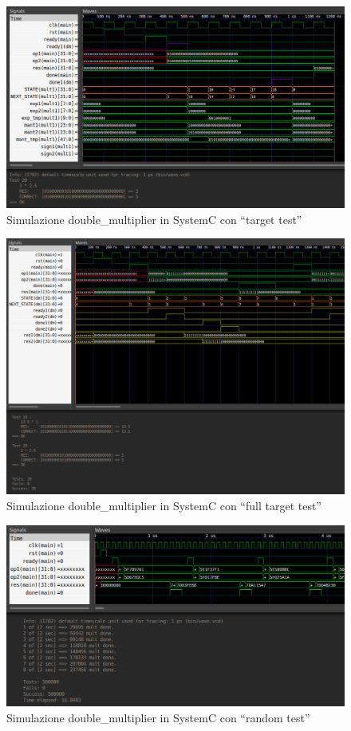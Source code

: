 \documentclass[]{IEEEtran}
\begin{document}
\begin{figure}[bt]
    \centering
    \includegraphics[width=\textwidth]{figures/sc_target}
    \caption{Simulazione double\_multiplier in SystemC con ``target test''}
    \label{fig:SIM_SC_TARGET}
\end{figure}

\begin{figure}[bt]
    \centering
    \includegraphics[width=\textwidth]{figures/sc_full}
    \caption{Simulazione double\_multiplier in SystemC con ``full target test''}
    \label{fig:SIM_SC_FULL}
\end{figure}

\begin{figure}[bt]
    \centering
    \includegraphics[width=\textwidth]{figures/sc_rnd}
    \caption{Simulazione double\_multiplier in SystemC con ``random test''}
    \label{fig:SIM_SC_RND}
\end{figure}
\end{document}
